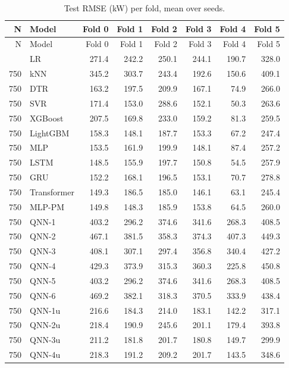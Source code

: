 \begin{longtable}{rlrrrrrr}
\caption{Test RMSE (kW) per fold, mean over seeds.}\label{tab:t3b} \\
\toprule
N & Model & Fold 0 & Fold 1 & Fold 2 & Fold 3 & Fold 4 & Fold 5 \\
\midrule
\endfirsthead
\toprule
N & Model & Fold 0 & Fold 1 & Fold 2 & Fold 3 & Fold 4 & Fold 5 \\
\midrule
\endhead
\bottomrule
\endlastfoot
750 & LR & 271.4 & 242.2 & 250.1 & 244.1 & 190.7 & 328.0 \\
750 & kNN & 345.2 & 303.7 & 243.4 & 192.6 & 150.6 & 409.1 \\
750 & DTR & 163.2 & 197.5 & 209.9 & 167.1 & 74.9 & 266.0 \\
750 & SVR & 171.4 & 153.0 & 288.6 & 152.1 & 50.3 & 263.6 \\
750 & XGBoost & 207.5 & 169.8 & 233.0 & 159.2 & 81.3 & 259.5 \\
750 & LightGBM & 158.3 & 148.1 & 187.7 & 153.3 & 67.2 & 247.4 \\
750 & MLP & 153.5 & 161.9 & 199.9 & 148.1 & 87.4 & 257.2 \\
750 & LSTM & 148.5 & 155.9 & 197.7 & 150.8 & 54.5 & 257.9 \\
750 & GRU & 152.2 & 168.1 & 196.5 & 153.1 & 70.7 & 278.8 \\
750 & Transformer & 149.3 & 186.5 & 185.0 & 146.1 & 63.1 & 245.4 \\
750 & MLP-PM & 149.8 & 148.3 & 185.9 & 153.8 & 64.5 & 260.0 \\
750 & QNN-1 & 403.2 & 296.2 & 374.6 & 341.6 & 268.3 & 408.5 \\
750 & QNN-2 & 467.1 & 381.5 & 358.3 & 374.3 & 407.3 & 449.3 \\
750 & QNN-3 & 408.1 & 307.1 & 297.4 & 356.8 & 340.4 & 427.2 \\
750 & QNN-4 & 429.3 & 373.9 & 315.3 & 360.3 & 225.8 & 450.8 \\
750 & QNN-5 & 403.2 & 296.2 & 374.6 & 341.6 & 268.3 & 408.5 \\
750 & QNN-6 & 469.2 & 382.1 & 318.3 & 370.5 & 333.9 & 438.4 \\
750 & QNN-1u & 216.6 & 184.3 & 214.0 & 183.1 & 142.2 & 317.1 \\
750 & QNN-2u & 218.4 & 190.9 & 245.6 & 201.1 & 179.4 & 393.8 \\
750 & QNN-3u & 211.2 & 181.8 & 201.7 & 180.8 & 149.7 & 299.9 \\
750 & QNN-4u & 218.3 & 191.2 & 209.2 & 201.7 & 143.5 & 348.6 \\

\end{longtable}
